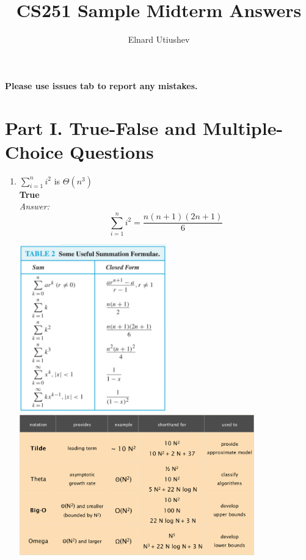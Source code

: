 \documentclass[a4paper]{article}
\title{CS251 Sample Midterm Answers}
\author{Elnard Utiushev}
\newcommand{\ans}{\textit{Answer: }}
\begin{document}
\maketitle

\textbf{Please use issues tab to report any mistakes.}

\section*{Part I. True-False and Multiple-Choice Questions}
\begin{enumerate}
  \item $\sum_{i=1}^{n}i^2$ is $\Theta(n^3)$ \\
  \textbf{True} \\
  \ans 
  $$\sum_{i=1}^{n}i^2 = \frac{n(n+1)(2n+1)}{6}$$
  \begin{center}
    \includegraphics[width=0.5\textwidth]{fig1.png}
    \includegraphics[width=0.8\textwidth]{fig2.png}
  \end{center}


\end{enumerate}
\end{document}
